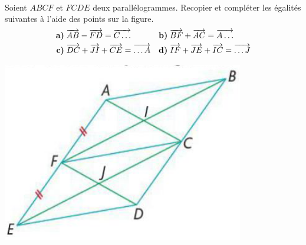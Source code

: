 \documentclass[11pt]{article}
\begin{document}
\begin{exo}~\\[-6mm]
  \begin{minipage}[]{.65\textwidth}
    Soient $ABCF$ et $FCDE$ deux parallélogrammes. Recopier et compléter les
    égalités suivantes à l'aide des points sur la figure.
    \begin{align*}
      \textbf{a)}\;& \overrightarrow{AB} - \overrightarrow{FD} = \overrightarrow{C\ldots} &
      \textbf{b)}\;& \overrightarrow{BF} + \overrightarrow{AC} = \overrightarrow{A\ldots} \\
      \textbf{c)}\;& \overrightarrow{DC} + \overrightarrow{JI} + \overrightarrow{CE} = \overrightarrow{\ldots A} &
      \textbf{d)}\;& \overrightarrow{IF} + \overrightarrow{JE} + \overrightarrow{IC} = \overrightarrow{\ldots J}
    \end{align*}
  \end{minipage}
  \begin{minipage}[]{.35\textwidth}
    \begin{center}
      \includegraphics[scale=.4]{para.png}
    \end{center}
  \end{minipage}
\end{exo}
\end{document}
